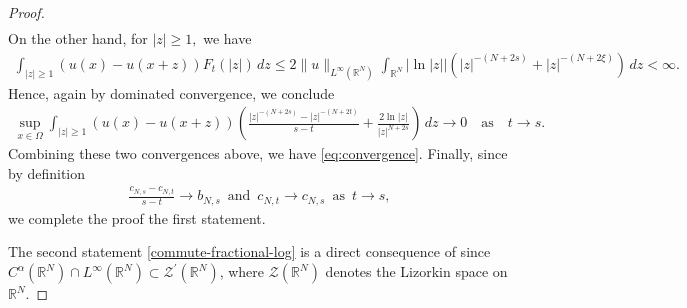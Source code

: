 \documentclass[notitlepage,11pt,reqno]{amsart}
\theoremstyle{definition}
\numberwithin{equation}{section}
\newcommand{\RR}{\mathds{R}}
\begin{document}
\begin{proof}
\begin{align*}
\end{align*}
On the other hand, for $|z|\geq 1,$ we have
\begin{align*}
\int_{|z|\geq 1}\left(u(x)-u(x+z)\right)F_t(|z|)\, dz\leq 2\|u\|_{L^{\infty}(\RR^N)}\int_{\RR^N}|\ln|z||\left(|z|^{-(N+2s)}+|z|^{-(N+2\xi)}\right)\, dz< \infty.
\end{align*}
Hence, again by dominated convergence, we conclude
\begin{align*}
    \sup_{x\in \Omega} \int_{|z|\geq 1} \left(u(x)-u(x+z)\right)\left(\frac{|z|^{-(N+2s)}-|z|^{-(N+2t)}}{s-t}+\frac{2\ln|z|}{|z|^{N+2s}}\right)\, dz \to 0\quad \text{as} \quad t\to s.
\end{align*}
Combining these two convergences above, we have \eqref{eq:convergence}. Finally, since  by definition
\begin{align*}
 \frac{c_{N, s}-c_{N, t}}{s-t}\to b_{N, s}\,\,\, \text{and}\,\,\, c_{N, t}\to c_{N, s}\,\,\, \text{as}\,\,\, t\to s,
\end{align*}
we complete the proof the first statement.

The second statement \eqref{commute-fractional-log} is a direct consequence of \cite[Theorem 1.1 (iv)]{CH26} since $C^{\alpha}(\RR^N)\cap L^{\infty}(\RR^N)\subset \mathcal{Z}^{\prime}(\RR^N)$, where $\mathcal{Z}(\RR^N)$ denotes the Lizorkin space on $\RR^N.$ 
\end{proof}
\end{document}
